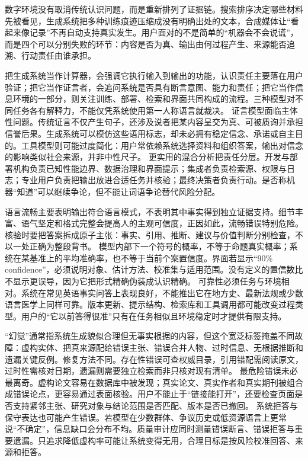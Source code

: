 数字环境没有取消传统认识问题，而是重新排列了证据链。搜索排序决定哪些材料先被看见，生成系统把多种训练痕迹压缩成没有明确出处的文本，合成媒体让“看起来像记录”不再自动支持真实发生。用户面对的不是简单的“机器会不会说谎”，而是四个可以分别失败的环节：内容是否为真、输出由何过程产生、来源能否追溯、行动责任由谁承担。

把生成系统当作计算器，会强调它执行输入到输出的功能，认识责任主要落在用户验证；把它当作证言者，会追问系统是否具有断言意图、能力和责任；把它当作信息环境的一部分，则关注训练、部署、检索和界面共同构成的流程。三种模型对不同任务各有解释力，不能仅凭系统使用第一人称语言就裁决。 证言模型面临主体性问题。传统证言不仅产生句子，还涉及说者把某内容呈交为真、可被质询并承担信誉后果。生成系统可以模仿这些语用标志，却未必拥有稳定信念、承诺或自主目的。工具模型则可能过度简化：用户常依赖系统选择资料和组织答案，输出对信念的影响类似社会来源，并非中性尺子。 更实用的混合分析把责任分层。开发与部署机构负责已知性能边界、数据治理和界面提示；集成者负责检索源、权限与日志；专业用户负责把输出放进合适任务并核验；最终决策者负责行动。是否称机器“知道”可以继续争论，但不能让词语争论替代风险分配。

语言流畅主要表明输出符合语言模式，不表明其中事实得到独立证据支持。细节丰富、语气坚定和格式完整会提高人的主观可信度，正因如此，流畅错误特别危险。核验时要把答案拆成原子主张：事实、引用、推断、建议与价值判断分别检查，不以一处正确为整段背书。 模型内部下一个符号的概率，不等于命题真实概率；系统在某基准上的平均准确率，也不等于当前个案置信度。界面若显示“90\% confidence”，必须说明对象、估计方法、校准集与适用范围。没有定义的置信数比不显示更误导，因为它把形式精确伪装成认识精确。 可靠性必须任务与环境相对。系统在常见英语事实问答上表现良好，不能推出它在地方史、最新法规或少数语言医学上同样可靠。版本更新、提示结构、检索库和工具调用都可能改变过程类型。用户的“它以前答得很准”只有在任务相似且环境稳定时才提供有限支持。

“幻觉”通常指系统生成貌似合理但无事实根据的内容，但这个宽泛标签掩盖不同故障：虚构实体、把真来源配给错误主张、错误合并人物、过时信息、无根据推断和遗漏关键反例。修复方法不同。存在性错误可查权威目录，引用错配需阅读原文，过时性需核对日期，遗漏则需要独立检索而非只核对现有清单。 最危险错误未必最离奇。虚构论文容易在数据库中被发现；真实论文、真实作者和真实期刊被组合成错误论点，更容易通过表面核验。用户不能止于“链接能打开”，还要检查页面是否支持紧邻主张、研究对象与结论范围是否匹配、版本是否已撤回。 系统拒答与保守表达也可能产生错误。若模型在少数群体、争议历史或低资源语言上更常说“不确定”，信息缺口会分布不均。质量审计应同时测量错误断言、错误拒答与重要遗漏。只追求降低虚构率可能让系统变得无用，合理目标是按风险校准回答、来源和拒答。

